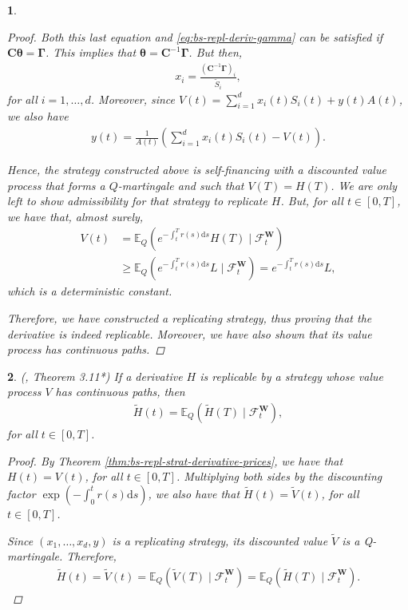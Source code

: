 \documentclass[english]{article}
\numberwithin{equation}{section}
\numberwithin{figure}{section}
\theoremstyle{bolddescit}
\newtheorem{theorem}{\protect\theoremname}[section]
\theoremstyle{definition}
\theoremstyle{definition}
\theoremstyle{plain}
\theoremstyle{plain}
\theoremstyle{bolddesc}
\theoremstyle{plain}
\theoremstyle{remark}
\providecommand{\theoremname}{Theorem}
\begin{document}
\begin{theorem}
\begin{proof}
    Both this last equation and \eqref{eq:bs-repl-deriv-gamma} can be satisfied if $\mathbf{C} \mathbf{\theta} = \mathbf{\Gamma}$. This implies that $\mathbf{\theta} = \mathbf{C}^{-1} \mathbf{\Gamma}$. But then,
    \begin{align*}
      x_i = \frac{(\mathbf{C}^{-1} \mathbf{\Gamma})_i}{\widetilde{S}_i},
    \end{align*}
    for all $i=1,\ldots,d$. Moreover, since $V(t) = \sum_{i=1}^d x_i(t) S_i(t) + y(t) A(t)$, we also have
    \begin{align*}
      y(t) = \frac{1}{A(t)} \left(\sum_{i=1}^d x_i(t) S_i(t) - V(t)\right).
    \end{align*}

    Hence, the strategy constructed above is self-financing with a discounted value process that forms a $Q$-martingale and such that $V(T) = H(T)$. We are only left to show admissibility for that strategy to replicate $H$. But, for all $t \in [0,T]$, we have that, almost surely,
    \begin{align*}
      V(t) &= \mathbb{E}_Q\left(e^{-\int_t^T r(s) \mathrm{d}s} H(T) \mid \mathcal{F}^\mathbf{W}_t\right)\\
      &\ge \mathbb{E}_Q\left(e^{-\int_t^T r(s) \mathrm{d}s} L \mid \mathcal{F}^\mathbf{W}_t\right)
      = e^{-\int_t^T r(s) \mathrm{d}s} L,
    \end{align*}
    which is a deterministic constant.

    Therefore, we have constructed a replicating strategy, thus proving that the derivative is indeed replicable. Moreover, we have also shown that its value process has continuous paths.
  \end{proof}
\end{theorem}

\begin{theorem}\label{thm:bs-derivative-pricing}
  (\cite{capinski_blackscholes_2012}, Theorem 3.11*)
  If a derivative $H$ is replicable by a strategy whose value process $V$ has continuous paths, then
  \begin{align}\label{eq:bs-derivative-pricing}
    \widetilde{H}(t) = \mathbb{E}_Q(\widetilde{H}(T) \mid \mathcal{F}^\mathbf{W}_t),
  \end{align}
  for all $t \in [0,T]$.

  \begin{proof}
    By Theorem \ref{thm:bs-repl-strat-derivative-prices}, we have that $H(t) = V(t)$, for all $t \in [0,T]$. Multiplying both sides by the discounting factor $\exp\left(-\int_0^t r(s) \mathrm{d}s\right)$, we also have that $\widetilde{H}(t) = \widetilde{V}(t)$, for all $t \in [0,T]$.

    Since $(x_1, \ldots, x_d, y)$ is a replicating strategy, its discounted value $\widetilde{V}$ is a Q-martingale. Therefore,
    \begin{align*}
      \widetilde{H}(t) = \widetilde{V}(t)
      = \mathbb{E}_Q(\widetilde{V}(T) \mid \mathcal{F}^\mathbf{W}_t)
      = \mathbb{E}_Q(\widetilde{H}(T) \mid \mathcal{F}^\mathbf{W}_t).
    \end{align*}
  \end{proof}
\end{theorem}
\end{document}
